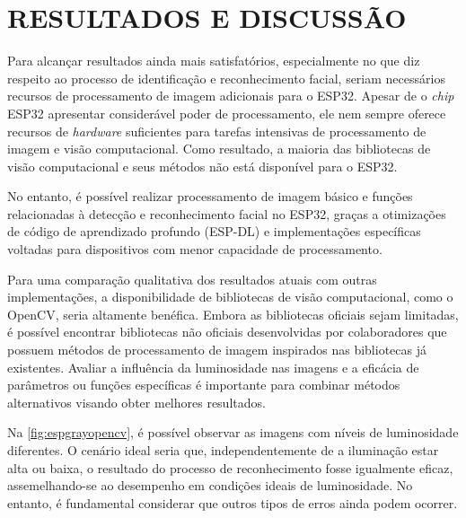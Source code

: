 
\chapter{RESULTADOS E DISCUSSÃO}\label{cap:resultados}

Para alcançar resultados ainda mais satisfatórios, especialmente no que diz respeito 
ao processo de identificação e reconhecimento facial, seriam necessários recursos 
de processamento de imagem adicionais para o ESP32. Apesar de o \textit{chip} ESP32 
apresentar considerável poder de processamento, ele nem sempre oferece recursos 
de \textit{hardware} suficientes para tarefas intensivas de processamento de 
imagem e visão computacional. Como resultado, a maioria das bibliotecas de 
visão computacional e seus métodos não está disponível para o ESP32.

No entanto, é possível realizar processamento de imagem básico e funções 
relacionadas à detecção e reconhecimento facial no ESP32, graças a 
otimizações de código de aprendizado profundo (ESP-DL) e implementações 
específicas voltadas para dispositivos com menor capacidade de processamento.

Para uma comparação qualitativa dos resultados atuais com outras implementações, 
a disponibilidade de bibliotecas de visão computacional, como o OpenCV, 
seria altamente benéfica. Embora as bibliotecas oficiais sejam limitadas, 
é possível encontrar bibliotecas não oficiais desenvolvidas por colaboradores 
que possuem métodos de processamento de imagem inspirados nas bibliotecas 
já existentes. Avaliar a influência da luminosidade nas imagens e a eficácia 
de parâmetros ou funções específicas é importante para combinar métodos 
alternativos visando obter melhores resultados.

Na \autoref{fig:espgrayopencv}, é possível observar as imagens com níveis 
de luminosidade diferentes. O cenário ideal seria que, independentemente 
de a iluminação estar alta ou baixa, o resultado do processo de reconhecimento 
fosse igualmente eficaz, assemelhando-se ao desempenho em condições 
ideais de luminosidade. No entanto, 
é fundamental considerar que outros tipos de erros 
ainda podem ocorrer.

